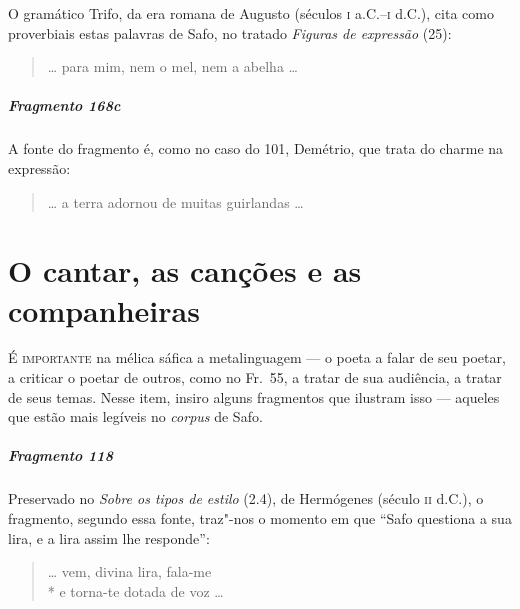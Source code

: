 {\small O gramático Trifo, da era romana de Augusto (séculos \textsc{i} a.C.--\textsc{i} d.C.), 
cita como proverbiais estas palavras de Safo, no tratado \textit{Figuras de expressão} (25):}

\begin{verse}
\ldots{} para mim, nem o mel, nem a abelha \ldots{}
\end{verse}

\paragraph{Fragmento 168c}

{\small A fonte do fragmento é, como no caso do 101, Demétrio, que trata do charme na
expressão:}

\begin{verse}
\ldots{} a terra adornou de muitas guirlandas \ldots{}
\end{verse}


\chapter[O cantar, as canções e as companheiras]{O cantar, as canções e as companheiras}

\textsc{É importante} na mélica sáfica a metalinguagem --- o poeta a falar de seu
poetar, a criticar o poetar de outros, como no Fr.~55, a tratar de sua
audiência, a tratar de seus temas. Nesse item, insiro alguns fragmentos que
ilustram isso --- aqueles que estão mais legíveis no \textit{corpus} de Safo.


\paragraph{Fragmento 118}

{\small Preservado no \textit{Sobre os tipos de estilo} (2.4), de Hermógenes (século \textsc{ii} d.C.),
o fragmento, segundo essa fonte, traz"-nos o momento em que ``Safo
questiona a sua lira, e a lira assim lhe responde”:}

\begin{verse}
\ldots{} vem, divina lira, fala-me\\*
e torna-te dotada de voz \ldots{}
\end{verse}



